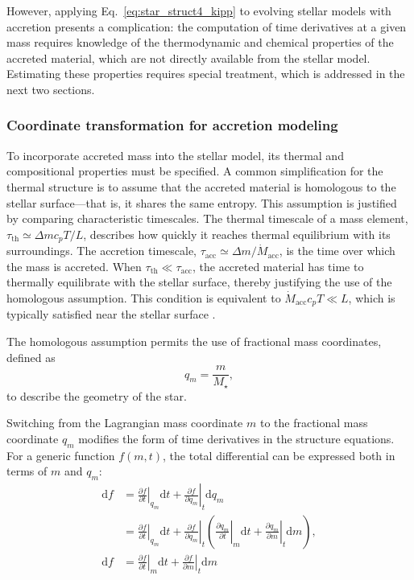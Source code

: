 \documentclass[12pt,a4paper]{article}
\newcommand{\mr}{\mathrm}
\newcommand{\pfird}[2][]{\frac{\partial#1}{\partial#2}}
\newcommand{\dd}[1]{\mathrm{d}#1}
\begin{document}
However, applying Eq.~\eqref{eq:star_struct4_kipp} to evolving stellar models with accretion presents a complication: 
the computation of time derivatives at a given mass requires knowledge of the thermodynamic and chemical properties of the accreted material, which are not directly available from the stellar model. Estimating these properties requires special treatment, which is addressed in the next two sections.

\subsubsection{Coordinate transformation for accretion modeling}
\label{sec:accretion_coords}

To incorporate accreted mass into the stellar model, its thermal and compositional properties must be specified. A common simplification for the thermal structure is to assume that the accreted material is homologous to the stellar surface—that is, it shares the same entropy. This assumption is justified by comparing characteristic timescales. The thermal timescale of a mass element, $\tau_\mr{th} \simeq \Delta m c_p T / L$, describes how quickly it reaches thermal equilibrium with its surroundings. The accretion timescale, $\tau_\mr{acc} \simeq \Delta m / \dot{M}_\mr{acc}$, is the time over which the mass is accreted. When $\tau_\mr{th} \ll \tau_\mr{acc}$, the accreted material has time to thermally equilibrate with the stellar surface, thereby justifying the use of the homologous assumption. This condition is equivalent to $\dot{M}_\mr{acc} c_p T \ll L$, which is typically satisfied near the stellar surface \parencite{SugimotoNomoto1975,PaxtonEtAl2015}. 

The homologous assumption permits the use of fractional mass coordinates, defined as \parencite{SugimotoNomoto1975}
\begin{equation}
  q_m = \frac{m}{M_\star}, \label{eq:frac_mass_coord}
\end{equation}
to describe the geometry of the star.

Switching from the Lagrangian mass coordinate $m$ to the fractional mass coordinate $q_m$ modifies the form of time derivatives in the structure equations. For a generic function $f(m,t)$, the total differential can be expressed both in terms of $m$ and $q_m$:
\begin{align}
  \dd{f} &= \left.\pfird[f]{t}\right|_{q_m} \dd{t} + \left.\pfird[f]{q_m}\right|_t\dd{q_m}\\ 
  &= \left.\pfird[f]{t}\right|_{q_m} \dd{t} + \left.\pfird[f]{q_m}\right|_t\left(\left.\pfird[q_m]{t}\right|_m \dd{t} + \left.\pfird[q_m]{m}\right|_t \dd{m}\right),\nonumber\\
  \dd{f} &= \left.\pfird[f]{t}\right|_m \dd{t} + \left.\pfird[f]{m}\right|_t \dd{m}
\end{align}
\end{document}
